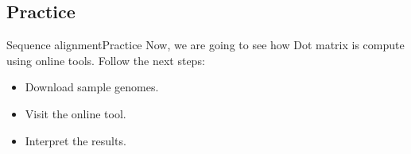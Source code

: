 \documentclass[10pt]{beamer}
\begin{document}
{%


\subsection{Practice}                                 %

\begin{frame}{Sequence alignment}{Practice}
Now, we are going to see how Dot matrix is compute using online tools. Follow the next steps:
\begin{itemize}
    \item Download sample genomes.
    \item Visit the online tool.
    \item Interpret the results.
\end{itemize}
\end{frame}

}
\end{document}
